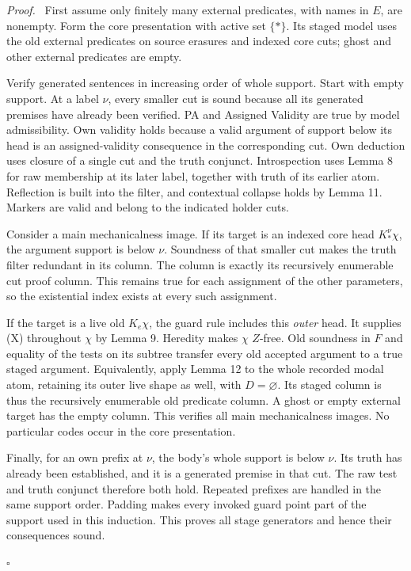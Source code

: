 \documentclass[11pt]{article}
\newcommand{\qed}{\hfill\ensuremath{\square}}
\newenvironment{proof}{\par\emph{Proof.}\ }{\qed\par}
\begin{document}
\begin{proof}
First assume only finitely many external predicates, with names in
$E$, are nonempty. Form the core presentation with active set $\{*\}$.
Its staged model uses the old external predicates on source erasures
and indexed core cuts; ghost and other external predicates are empty.

Verify generated sentences in increasing order of whole support.
Start with empty support. At a label $\nu$, every smaller cut is sound
because all its generated premises have already been verified.
PA and Assigned Validity are true by model admissibility. Own
validity holds because a valid argument of support below its head is
an assigned-validity consequence in the corresponding cut. Own
deduction uses closure of a single cut and the truth conjunct.
Introspection uses Lemma 8 for raw membership at its later label,
together with truth of its earlier atom. Reflection is built into the
filter, and contextual collapse holds by Lemma 11. Markers are valid
and belong to the indicated holder cuts.

Consider a main mechanicalness image. If its target is an indexed
core head $K_*^\nu\chi$, the argument support is below $\nu$.
Soundness of that smaller cut makes the truth filter redundant in
its column. The column is exactly its recursively enumerable cut
proof column. This remains true for each assignment of the other
parameters, so the existential index exists at every such assignment.

If the target is a live old $K_e\chi$, the guard rule includes this
\emph{outer} head. It supplies (X) throughout $\chi$ by Lemma 9.
Heredity makes $\chi$ $Z$-free. Old soundness in $F$ and equality of
the tests on its subtree transfer every old accepted argument to a
true staged argument. Equivalently, apply Lemma 12 to the whole
recorded modal atom, retaining its outer live shape as well, with
$D=\varnothing$. Its staged column is thus the recursively enumerable
old predicate column. A ghost or empty external target has the empty
column. This verifies all main mechanicalness images. No particular
codes occur in the core presentation.

Finally, for an own prefix at $\nu$, the body's whole support is
below $\nu$. Its truth has already been established, and it is a
generated premise in that cut. The raw test and truth conjunct
therefore both hold. Repeated prefixes are handled in the same
support order. Padding makes every invoked guard point part of the
support used in this induction. This proves all stage generators and
hence their consequences sound.


\end{proof}
\end{document}
